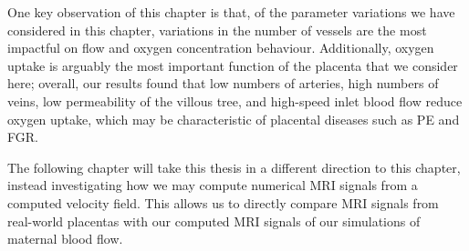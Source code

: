         One key observation of this chapter is that, of the parameter variations we have considered in this chapter, variations in the number of vessels are the most impactful on flow and oxygen concentration behaviour. Additionally, oxygen uptake is arguably the most important function of the placenta that we consider here; overall, our results found that low numbers of arteries, high numbers of veins, low permeability of the villous tree, and high-speed inlet blood flow reduce oxygen uptake, which may be characteristic of placental diseases such as PE and FGR.

        The following chapter will take this thesis in a different direction to this chapter, instead investigating how we may compute numerical MRI signals from a computed velocity field. This allows us to directly compare MRI signals from real-world placentas with our computed MRI signals of our simulations of maternal blood flow.

        



